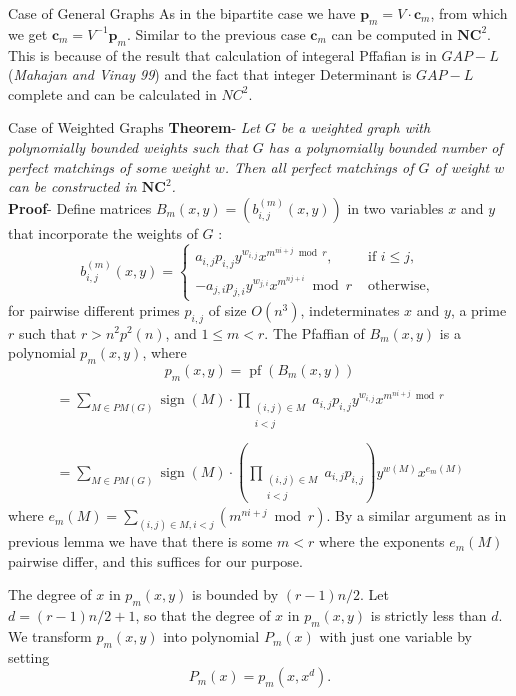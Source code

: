 \documentclass{beamer}
\begin{document}
\begin{frame}[allowframebreaks]{Case of General Graphs }
	As in the bipartite case we have $\boldsymbol{p}_m=V \cdot \boldsymbol{c}_m$, from which we get $\boldsymbol{c}_m=V^{-1} \boldsymbol{p}_m$. Similar to the previous case $ \boldsymbol{c}_m$ can be computed in $\mathbf{N C}^2$.
	\\
	This is because of the result that calculation of integeral Pffafian is in $GAP-L$ (\textit{Mahajan and Vinay 99}) and the fact that integer Determinant is $GAP-L$ complete and can be calculated in $NC^2$.
\end{frame}
\begin{frame}[allowframebreaks]{Case of Weighted Graphs}
	\textbf{Theorem}- \textit{Let $G$ be a weighted graph with polynomially bounded weights such that $G$ has a polynomially bounded number of perfect matchings of some weight $w$. Then all perfect matchings of $G$ of weight $w$ can be constructed in $\mathbf{N C}^2$.} \\
	\textbf{Proof}- 
	Define matrices $B_m(x, y)=\left(b_{i, j}^{(m)}(x, y)\right)$ in two variables $x$ and $y$ that incorporate the weights of $G$ :
	$$
	b_{i, j}^{(m)}(x, y)= \begin{cases}a_{i, j} p_{i, j} y^{w_{i, j}} x^{m^{n i+j} \bmod r}, & \text { if } i \leq j, \\ -a_{j, i} p_{j, i} y^{w_{j, i}} x^{m^{n j+i}} \bmod r & \text { otherwise, }\end{cases}
	$$
	for pairwise different primes $p_{i, j}$ of size $O\left(n^3\right)$, indeterminates $x$ and $y$, a prime $r$ such that $r>n^2 p^2(n)$, and $1 \leq m<r$.
	The Pfaffian of $B_m(x, y)$ is a polynomial $p_m(x, y)$, where $$p_m(x, y)=\operatorname{pf}\left(B_m(x, y)\right) $$
	$$
	\begin{aligned}
		\\ =\sum_{M \in P M(G)} \operatorname{sign}(M) \cdot \prod_{\substack{(i, j) \in M \\
				i<j}} a_{i, j} p_{i, j} y^{w_{i, j}} x^{m^{n i+j} \bmod r} \\
		\\ =\sum_{M \in P M(G)} \operatorname{sign}(M) \cdot\left(\prod_{\substack{(i, j) \in M \\
				i<j}} a_{i, j} p_{i, j}\right) y^{w(M)} x^{e_m(M)}
	\end{aligned}
	$$
	where $e_m(M)=\sum_{(i, j) \in M,i<j}\left(m^{n i+j} \bmod r\right)$. By a similar argument as in previous lemma 
	we have that there is some $m<r$ where the exponents $e_m(M)$ pairwise differ, and this suffices for our purpose.
	
	The degree of $x$ in $p_m(x, y)$ is bounded by $(r-1) n / 2$. Let $d=(r-1) n / 2+1$, so that the degree of $x$ in $p_m(x, y)$ is strictly less than $d$. We transform $p_m(x, y)$ into polynomial $P_m(x)$ with just one variable by setting
	$$
	P_m(x)=p_m\left(x, x^d\right) .
	$$
	

\end{frame}
\end{document}
